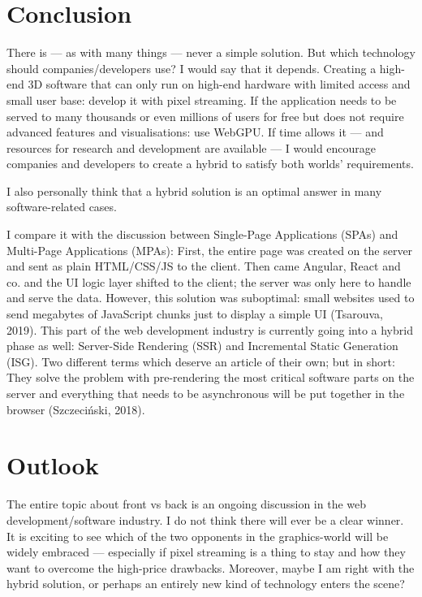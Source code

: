 \documentclass[10pt]{article}
\begin{document}
\begin{sloppypar}
  \section{Conclusion}
  \label{sec:conclusion}

  There is — as with many things — never a simple solution. But which technology should companies/developers use? I would say that it depends. Creating a high-end 3D software that can only run on high-end hardware with limited access and small user base: develop it with pixel streaming. If the application needs to be served to many thousands or even millions of users for free but does not require advanced features and visualisations: use WebGPU. If time allows it — and resources for research and development are available — I would encourage companies and developers to create a hybrid to satisfy both worlds’ requirements.

  I also personally think that a hybrid solution is an optimal answer in many software-related cases.

  I compare it with the discussion between Single-Page Applications (SPAs) and Multi-Page Applications (MPAs): First, the entire page was created on the server and sent as plain HTML/CSS/JS to the client. Then came Angular, React and co. and the UI logic layer shifted to the client; the server was only here to handle and serve the data. However, this solution was suboptimal: small websites used to send megabytes of JavaScript chunks just to display a simple UI (Tsarouva, 2019). This part of the web development industry is currently going into a hybrid phase as well: Server-Side Rendering (SSR) and Incremental Static Generation (ISG). Two different terms which deserve an article of their own; but in short: They solve the problem with pre-rendering the most critical software parts on the server and everything that needs to be asynchronous will be put together in the browser (Szczeciński, 2018).

  \section{Outlook}
  \label{sec:outlook}

  The entire topic about front vs back is an ongoing discussion in the web development/software industry. I do not think there will ever be a clear winner. It is exciting to see which of the two opponents in the graphics-world will be widely embraced — especially if pixel streaming is a thing to stay and how they want to overcome the high-price drawbacks. Moreover, maybe I am right with the hybrid solution, or perhaps an entirely new kind of technology enters the scene?




  \pagebreak
  
  

\end{sloppypar}
\end{document}
